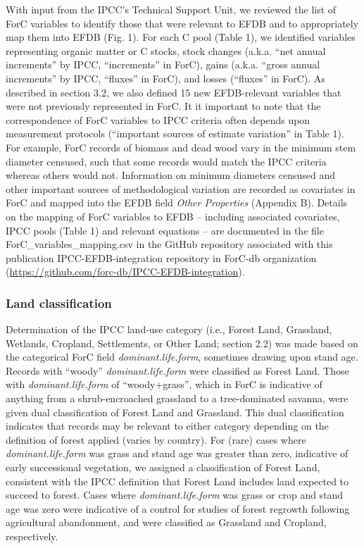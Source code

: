 \documentclass[, manuscript]{copernicus}
\begin{document}
With input from the IPCC's Technical Support Unit, we reviewed the list
of ForC variables to identify those that were relevant to EFDB and to
appropriately map them into EFDB (Fig. 1). For each C pool (Table 1), we
identified variables representing organic matter or C stocks, stock
changes (a.k.a. ``net annual increments'' by IPCC, ``increments'' in
ForC), gains (a.k.a. ``gross annual increments'' by IPCC, ``fluxes'' in
ForC), and losses (``fluxes'' in ForC). As described in section 3.2, we
also defined 15 new EFDB-relevant variables that were not previously
represented in ForC. It it important to note that the correspondence of
ForC variables to IPCC criteria often depends upon measurement protocols
(``important sources of estimate variation'' in Table 1). For example,
ForC records of biomass and dead wood vary in the minimum stem diameter
censused, such that some records would match the IPCC criteria whereas
others would not. Information on minimum diameters censused and other
important sources of methodological variation are recorded as covariates
in ForC and mapped into the EFDB field \emph{Other Properties} (Appendix
B). Details on the mapping of ForC variables to EFDB -- including
associated covariates, IPCC pools (Table 1) and relevant equations
\citep{ipcc_2006_2006} -- are documented in the file
ForC\_variables\_mapping.csv in the GitHub repository associated with
this publication IPCC-EFDB-integration repository in ForC-db
organization (\url{https://github.com/forc-db/IPCC-EFDB-integration}).

\subsubsection{Land classification}

Determination of the IPCC land-use category (i.e., Forest Land,
Grassland, Wetlands, Cropland, Settlements, or Other Land; section 2.2)
was made based on the categorical ForC field \emph{dominant.life.form},
sometimes drawing upon stand age. Records with ``woody''
\emph{dominant.life.form} were classified as Forest Land. Those with
\emph{dominant.life.form} of ``woody+grass'', which in ForC is
indicative of anything from a shrub-encroached grassland to a
tree-dominated savanna, were given dual classification of Forest Land
and Grassland. This dual classification indicates that records may be
relevant to either category depending on the definition of forest
applied (varies by country). For (rare) cases where
\emph{dominant.life.form} was grass and stand age was greater than zero,
indicative of early successional vegetation, we assigned a
classification of Forest Land, consistent with the IPCC definition that
Forest Land includes land expected to succeed to forest. Cases where
\emph{dominant.life.form} was grass or crop and stand age was zero were
indicative of a control for studies of forest regrowth following
agricultural abandonment, and were classified as Grassland and Cropland,
respectively.
\end{document}
